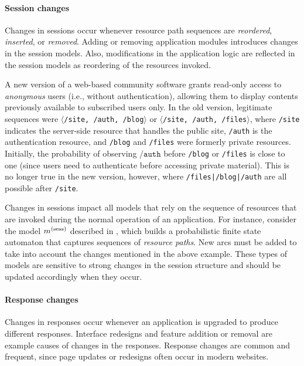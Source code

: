 \paragraph{Session changes} Changes in sessions occur whenever resource path sequences are \emph{reordered}, \emph{inserted}, or \emph{removed}. Adding or removing application modules introduces changes in the session models. Also, modifications in the application logic are reflected in the session models as reordering of the resources invoked.

\begin{example}
  A new version of a web-based community software grants read-only access to \emph{anonymous} users (i.e., without authentication), allowing them to display contents previously available to subscribed users only. In the old version, legitimate sequences were $\langle$\texttt{/site, /auth, /blog}$\rangle$ or $\langle$\texttt{/site, /auth, /files}$\rangle$, where \texttt{/site} indicates the server-side resource that handles the public site, \texttt{/auth} is the authentication resource, and \texttt{/blog} and \texttt{/files} were formerly private resources. Initially, the probability of observing $\mathtt{/auth}$ before \texttt{/blog} or \texttt{/files} is close to one (since users need to authenticate before accessing private material). This is no longer true in the new version, however, where \texttt{/files|/blog|/auth} are all possible after \texttt{/site}.
\end{example}

Changes in sessions impact all models that rely on the sequence of resources that are invoked during the normal operation of an application. For instance, consider the model $m^{\left(\text{sess}\right)}$ described in \citep{kruegel:jcn2005:webanomaly}, which builds a probabilistic finite state automaton that captures sequences of \emph{resource paths}. New arcs must be added to take into account the changes mentioned in the above example. These types of models are sensitive to strong changes in the session structure and should be updated accordingly when they occur.

\paragraph{Response changes} Changes in responses occur whenever an application is upgraded to produce different responses. Interface redesigns and feature addition or removal are example causes of changes in the responses. Response changes are common and frequent, since page updates or redesigns often occur in modern websites.

